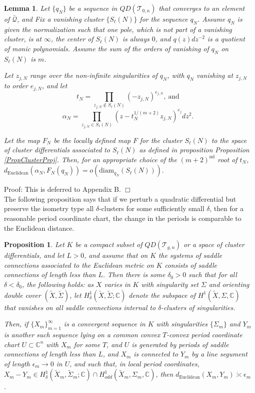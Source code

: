 \documentclass[12pt]{article}
\newtheorem{proposition}[theorem]{Proposition}
\newtheorem{lemma}[theorem]{Lemma}
\newcommand{\cc}{\mathbb{C}}
\newcommand{\diam}{\mathrm{diam}}
\begin{document}
\begin{lemma}\label{LemAsympClust}Let $\{q_N\}$ be a sequence in $QD(\mathcal{T}_{0,n})$ that converges to an element of $\bar{\mathcal{Q}}$, and Fix a vanishing cluster $\{S_\ell(N)\}$ for the sequence $q_N$. Assume $q_N$ is given the normalization such that one pole, which is not part of a vanishing cluster, is at $\infty$, the center of $S_\ell(N)$ is always $0$, and $q(z)dz^{-2}$ is a quotient of monic polynomials. Assume the sum of the orders of vanishing of $q_N$ on $S_\ell(N)$ is $m$.

\noindent Let $z_{j,N}$ range over the non-infinite singularities of $q_N$, with $q_N$ vanishing at $z_{j,N}$ to order $e_{j,N}$, and let $$t_N = \prod\limits_{z_{j,N} \notin S_\ell(N)} (-z_{j,N})^{e_{j,N}},~\mathrm{and}$$ $$\alpha_N = \prod\limits_{z_{j,N} \in S_\ell(N)} \left(z - t_N^{1/(m+2)}z_{j,N}\right)^{e_j} dz^2.$$

Let the map $F_N$ be the locally defined map $F$ for the cluster $S_\ell(N)$ to the space of cluster differentials associated to $S_\ell(N)$ as defined in proposition Proposition \ref{PropClusterProj}. Then, for an appropriate choice of the $(m+2)^{\mathrm{nd}}$ root of $t_N$, $d_\mathrm{Euclidean}(\alpha_N, F_N(q_N)) = o(\diam_{q_N}(S_\ell(N))).$ \end{lemma}

\noindent Proof: This is deferred to Appendix B. $\Box$\\

\noindent The following proposition says that if we perturb a quadratic differential but preserve the isometry type all $\delta$-clusters for some sufficiently small $\delta$, then for a reasonable period coordinate chart, the change in the periods is comparable to the Euclidean distance.\\

\begin{proposition}\label{PropNoCancellation}Let $K$ be a compact subset of $QD(\mathcal{T}_{g,n})$ or a space of cluster differentials, and let $L > 0$, and assume that on $K$ the systems of saddle connections associated to the Euclidean metric on $K$ consists of saddle connections of length less than $L$. Then there is some $\delta_0 > 0$ such that for all $\delta < \delta_0$, the following holds: as $X$ varies in $K$ with singularity set $\Sigma$ and orienting double cover $(\tilde{X},\tilde{\Sigma})$, let $H_\delta^1(\tilde{X},\tilde{\Sigma}; \cc)$ denote the subspace of $H^1(\tilde{X},\Sigma,\cc)$ that vanishes on all saddle connections internal to $\delta$-clusters of singularities.

Then, if $\{X_m\}_{m = 1}^\infty$ is a convergent sequence in $K$ with singularities $\{\Sigma_m\}$ and $Y_m$ is another such sequence lying on a common convex $T$-convex period coordinate chart $U \subset \cc^n$ with $X_m$ for some $T$, and $U$ is generated by periods of saddle connections of length less than $L$, and $X_m$ is connected to $Y_m$ by a line segument of length $\epsilon_m \to 0$ in $U$, and such that, in local period coordinates, $X_m - Y_m \in H_\delta^1(\tilde{X}_m,\tilde{\Sigma}_m; \cc) \cap H_{odd}^1(\tilde{X}_m,{\Sigma}_m,\cc)$, then $d_\mathrm{Euclidean}(X_m,Y_m) \dot{\asymp} \epsilon_m$. \end{proposition}
\end{document}
